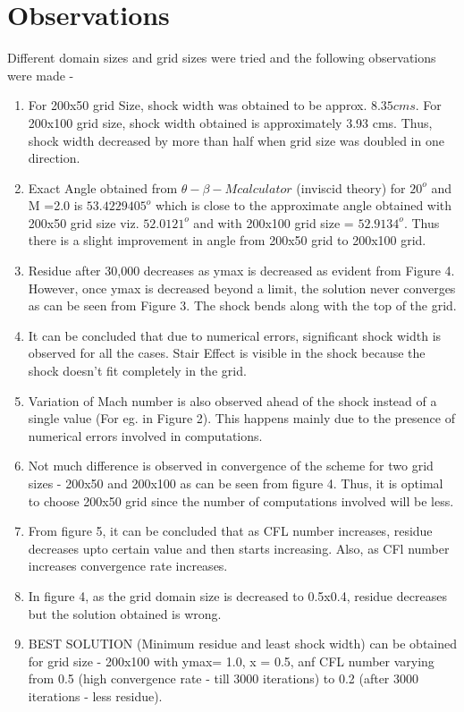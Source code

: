 \documentclass{article}
\begin{document}
\newpage
\section*{Observations}
Different domain sizes and grid sizes were tried and the following observations were made -
\begin{enumerate}
\item For 200x50 grid Size, shock width was obtained to be approx. $8.35 cms$. For 200x100 grid size, shock width obtained is approximately 3.93 cms. Thus, shock width decreased by more than half when grid size was doubled in one direction.
\item Exact Angle obtained from $\theta-\beta-M calculator$ (inviscid theory) for $20^o$ and M =2.0 is $53.4229405^o$ which is close to the approximate angle obtained with 200x50 grid size viz. $52.0121^o$ and with 200x100 grid size = $52.9134^o$. Thus there is a slight improvement in angle from 200x50 grid to 200x100 grid.
\item Residue after 30,000 decreases as ymax is decreased as evident from Figure 4. However, once ymax is decreased beyond a limit, the solution never converges as can be seen from Figure 3. The shock bends along with the top of the grid.
\item It can be concluded that due to numerical errors, significant shock width is observed for all the cases. Stair Effect is visible in the shock because the shock doesn't fit completely in the grid.
\item Variation of Mach number is also observed ahead of the shock instead of a single value (For eg. in Figure 2). This happens mainly due to the presence of numerical errors involved in computations.
\item Not much difference is observed in convergence of the scheme for two grid sizes - 200x50 and 200x100 as can be seen from figure 4. Thus, it is optimal to choose 200x50 grid since the number of computations involved will be less.
\item From figure 5, it can be concluded that as CFL number increases, residue decreases upto certain value and then starts increasing. Also, as CFl number increases convergence rate increases.
\item In figure 4, as the grid domain size is decreased to 0.5x0.4, residue decreases but the solution obtained is wrong.
\item BEST SOLUTION (Minimum residue and least shock width) can be obtained for grid size - 200x100 with ymax= 1.0, x = 0.5, anf CFL number varying from 0.5 (high convergence rate - till 3000 iterations) to 0.2 (after 3000 iterations - less residue).
\end{enumerate}
\end{document}
